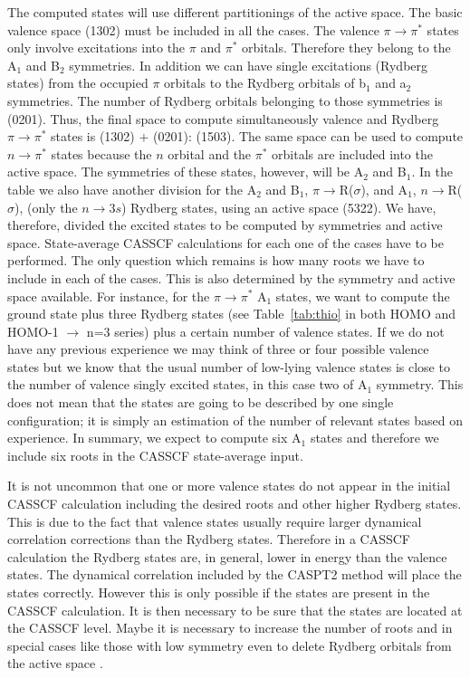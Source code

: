 The computed states will use different partitionings of the active space. The
basic valence space (1302) must be included in all the cases. The valence 
$\pi\to\pi^*$ states only involve excitations into the $\pi$ and $\pi^*$
orbitals. Therefore they belong to the A$_1$ and B$_2$ symmetries. In addition
we can have single excitations (Rydberg states) from the occupied $\pi$
orbitals to the Rydberg orbitals of b$_1$ and a$_2$ symmetries. The number of
Rydberg orbitals belonging to those symmetries is (0201). Thus, the final space
to compute simultaneously valence and Rydberg $\pi\to\pi^*$ states is
(1302) $+$ (0201): (1503). The same space can be used to compute
$n\to\pi^*$ states because the $n$ orbital and the $\pi^*$ orbitals
are included into the active space. The symmetries of these states, however,
will be A$_2$ and B$_1$. In the table we also have another
division for the A$_2$ and B$_1$, $\pi\to$R($\sigma$), and A$_1$, $n\to$R($\sigma$),
(only the $n\to$3$s$) Rydberg states, using an active space (5322).
We have, therefore, divided the excited states to be computed by symmetries
and active space. State-average CASSCF calculations for each one of
the cases have to be performed. The only question which remains is how many roots
we have to include in each of the cases. This is also determined by the symmetry
and active space available. For instance, for the $\pi\to\pi^*$ A$_1$ states,
we want to compute the ground state plus three Rydberg states (see Table~\ref{tab:thio} in both
HOMO and HOMO-1 $\to$ n=3 series) plus a certain number of valence states.
If we do not have any previous experience we may think of three or four possible
valence states but we know that the usual number of low-lying valence
states is close to the number of valence singly excited states, in this case
two of A$_1$ symmetry. This does not mean that the states are
going to be described by one single configuration; it is simply an estimation
of the number of relevant states based on experience. In summary, we expect
to compute six A$_1$ states and therefore we include six roots in the 
CASSCF state-average input.

It is not uncommon that one or more valence states do not appear in the
initial CASSCF calculation including the desired roots and other higher Rydberg 
states. This is   
due to the fact that valence states usually require larger dynamical
correlation corrections than the Rydberg states. Therefore in a CASSCF
calculation the Rydberg states are, in general, lower in energy than the valence states.
The dynamical correlation included by the CASPT2 method will place the
states correctly. However this is only possible if the states are present
in the CASSCF calculation. It is then necessary to be sure that the states
are located at the CASSCF level. Maybe it is necessary to increase
the number of roots and in special cases like those with low symmetry
even to delete Rydberg orbitals from the active space
\cite{Roos:95a,Roos:96b,Serrano:96a,Serrano:96b}.

